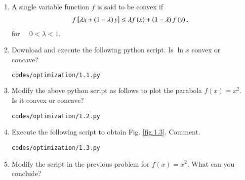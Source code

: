 \renewcommand{\theequation}{\theenumi}

\begin{enumerate}[label=\arabic*.,ref=\thesection.\theenumi]

\item A single variable function $f$ is said to be convex if
%
\begin{align}
\label{ch1_convex_def}
f{}\left[\lambda x + \left(1-\lambda\right)y\right] \leq \lambda f\left(x\right) + \left(1-\lambda\right)f\left(y\right), 
\end{align}
%
for $\quad 0 < \lambda < 1$.


\item
Download and execute the following python script. Is  $\ln x$ convex or  concave?

%
\begin{lstlisting}[language=sh]
codes/optimization/1.1.py
\end{lstlisting}
%
%
\item
Modify the above python script as follows to plot the parabola $f(x) = x^2$. Is it convex or concave?

\begin{lstlisting}
codes/optimization/1.2.py
\end{lstlisting}
%
%
\item
Execute the following script to obtain Fig. \ref{fig.1.3}. Comment.

%
\begin{lstlisting}
codes/optimization/1.3.py
\end{lstlisting}

%
%
\item
Modify the script in the previous problem for $f(x) = x^2$.  What can you conclude?


\end{enumerate}
